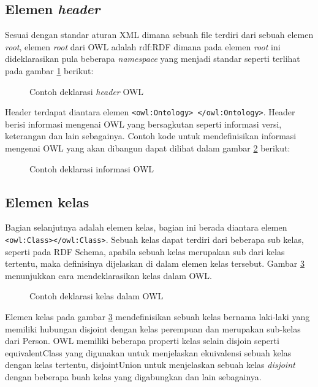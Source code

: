 \subsection{Elemen \emph{header}}
Sesuai dengan standar aturan XML dimana sebuah file terdiri dari sebuah elemen \emph{root}, elemen \emph{root} dari OWL adalah rdf:RDF dimana pada elemen \emph{root} ini dideklarasikan pula beberapa \emph{namespace} yang menjadi standar seperti terlihat pada gambar \ref{fig:deklarasi_header_owl} berikut:
\begin{figure}[ht]
	\centering
	
	\caption{Contoh deklarasi \emph{header} OWL}
	\label{fig:deklarasi_header_owl}
\end{figure}

Header terdapat diantara elemen \texttt{<owl:Ontology> </owl:Ontology>}. Header berisi informasi mengenai OWL yang bersagkutan seperti informasi versi, keterangan dan lain sebagainya. Contoh kode untuk mendefinisikan informasi mengenai OWL yang akan dibangun dapat dilihat dalam gambar \ref{fig:deklarasi_informasi_owl} berikut:
\begin{figure}[hb]
	\centering
	
	\caption{Contoh deklarasi informasi OWL}
	\label{fig:deklarasi_informasi_owl}
\end{figure}

\subsection{Elemen kelas}
Bagian selanjutnya adalah elemen kelas, bagian ini berada diantara elemen \texttt{<owl:Class></owl:Class>}. Sebuah kelas dapat terdiri dari beberapa sub kelas, seperti pada RDF Schema, apabila sebuah kelas merupakan sub dari kelas tertentu, maka definisinya dijelaskan di dalam elemen kelas tersebut. Gambar \ref{fig:deklarasi_kelas_owl} menunjukkan cara mendeklarasikan kelas dalam OWL.
\begin{figure}[hb]
	\centering
	
	\caption{Contoh deklarasi kelas dalam OWL}
	\label{fig:deklarasi_kelas_owl}
\end{figure}

Elemen kelas pada gambar \ref{fig:deklarasi_kelas_owl} mendefinisikan sebuah kelas bernama laki-laki yang memiliki hubungan disjoint dengan kelas perempuan dan merupakan sub-kelas dari Person. OWL memiliki beberapa properti kelas selain disjoin seperti equivalentClass yang digunakan untuk menjelaskan ekuivalensi sebuah kelas dengan kelas tertentu, disjointUnion untuk menjelaskan sebuah kelas \emph{disjoint} dengan beberapa buah kelas yang digabungkan dan lain sebagainya.

